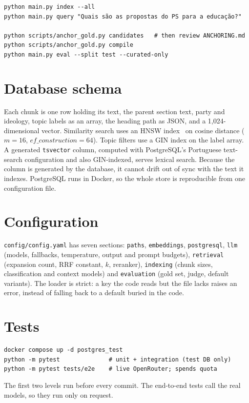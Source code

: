 {\small
\begin{verbatim}
python main.py index --all
python main.py query "Quais são as propostas do PS para a educação?"

python scripts/anchor_gold.py candidates   # then review ANCHORING.md
python scripts/anchor_gold.py compile
python main.py eval --split test --curated-only
\end{verbatim}
}

\section{Database schema} \label{sec:tooling-schema}

Each chunk is one row holding its text, the parent
section text, party and ideology, topic labels as an array, the heading path
as JSON, and a 1{,}024-dimensional vector. Similarity search uses an HNSW
index~\citep{malkov2020hnsw} on cosine distance
($m = 16$, $\mathit{ef\_construction} = 64$). Topic filters use a GIN index
on the label array. A generated \texttt{tsvector} column, computed with
PostgreSQL's Portuguese text-search configuration and also GIN-indexed,
serves lexical search. Because the column is generated by the database, it
cannot drift out of sync with the text it indexes. PostgreSQL runs in Docker,
so the whole store is reproducible from one configuration file.

\section{Configuration} \label{sec:tooling-config}

\texttt{config/config.yaml} has seven sections: \texttt{paths},
\texttt{embeddings}, \texttt{postgresql}, \texttt{llm} (models, fallbacks,
temperature, output and prompt budgets), \texttt{retrieval} (expansion count,
RRF constant, $k$, reranker), \texttt{indexing} (chunk sizes, classification and
context models) and \texttt{evaluation} (gold set, judge, default variants).
The loader is strict: a key the code reads but the file lacks raises an error,
instead of falling back to a default buried in the code.

\section{Tests} \label{sec:tooling-tests}

{\small
\begin{verbatim}
docker compose up -d postgres_test
python -m pytest              # unit + integration (test DB only)
python -m pytest tests/e2e    # live OpenRouter; spends quota
\end{verbatim}
}

The first two levels run before every commit. The end-to-end tests call the
real models, so they run only on request.
